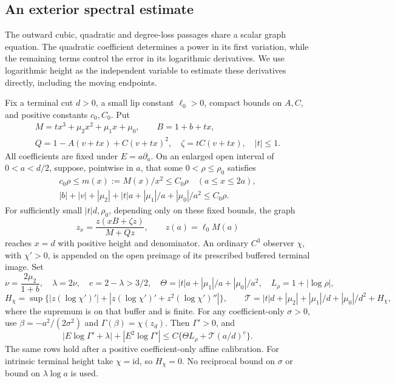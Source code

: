 \subsection{An exterior spectral estimate}

The outward cubic, quadratic and degree-loss passages share a scalar
graph equation. The quadratic coefficient determines a power in its
first variation, while the remaining terms control the error in its
logarithmic derivatives. We use logarithmic height as the independent
variable to estimate these derivatives directly, including the moving
endpoints.

\begin{lemma}\label{deg:lem-spectral-exterior}
Fix a terminal cut \(d>0\), a small lip constant \(\ell_0>0\), compact
bounds on \(A,C\), and positive constants \(c_0,C_0\). Put
\[
 \begin{gathered}
 M=tx^3+\mu_2x^2+\mu_1x+\mu_0,\qquad B=1+b+tx,\\
 Q=1-A(v+tx)+C(v+tx)^2,\quad \zeta=tC(v+tx),\quad |t|\le1.
 \end{gathered}
\]
All coefficients are fixed under \(E=a\partial_a\). On an enlarged
open interval of \(0<a<d/2\), suppose, pointwise in \(a\), that
some \(0<\rho\le\rho_0\) satisfies
\begin{equation}\label{deg:spectral-exterior-hypotheses}
 \begin{gathered}
 c_0\rho\le m(x):=M(x)/x^2\le C_0\rho\quad(a\le x\le2a),\\
 |b|+|v|+|\mu_2|+|t|a+|\mu_1|/a+|\mu_0|/a^2\le C_0\rho .
 \end{gathered}
\end{equation}
For sufficiently small \(|t|d,\rho_0\), depending only on these
fixed bounds, the graph
\begin{equation}\label{deg:spectral-exterior-graph}
 z_x=\frac{z(xB+\zeta z)}{M+Qz},\qquad z(a)=\ell_0M(a)
\end{equation}
reaches \(x=d\) with positive height and denominator. An ordinary
\(C^3\) observer \(\chi\), with \(\chi'>0\), is appended on the
open preimage of its prescribed buffered terminal image. Set
\[
 \nu=\frac{2\mu_2}{1+b},\quad\lambda=2\nu,\quad e=2-\lambda>3/2,
 \quad\Theta=|t|a+|\mu_1|/a+|\mu_0|/a^2,\quad L_\rho=1+|\log\rho|,
\]
\[
 H_\chi=\sup\{|z(\log\chi')'|
       +|z(\log\chi')'+z^2(\log\chi')''|\},\qquad
 \mathcal T=|t|d+|\mu_2|+|\mu_1|/d+|\mu_0|/d^2+H_\chi ,
\]
where the supremum is on that buffer and is finite.
For any coefficient-only \(\sigma>0\), use
\(\beta=-a^2/(2\sigma^2)\) and \(\Gamma(\beta)=\chi(z_d)\).
Then \(\Gamma'>0\), and
\begin{equation}\label{deg:spectral-exterior-rows}
 |E\log\Gamma'+\lambda|+|E^2\log\Gamma'|
 \le C\{\Theta L_\rho+\mathcal T(a/d)^e\}.
\end{equation}
The same rows hold after a positive coefficient-only affine calibration.
For intrinsic terminal height take \(\chi=\mathrm{id}\), so \(H_\chi=0\).
No reciprocal bound on \(\sigma\) or bound on \(\lambda\log a\) is used.
\end{lemma}
